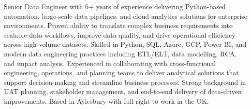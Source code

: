 
\begin{cvparagraph}

Senior Data Engineer with 6+ years of experience delivering Python-based automation, large-scale data pipelines, and cloud analytics solutions for enterprise environments. Proven ability to translate complex business requirements into scalable data workflows, improve data quality, and drive operational efficiency across high-volume datasets. Skilled in Python, SQL, Azure, GCP, Power BI, and modern data engineering practices including ETL/ELT, data modelling, RCA, and impact analysis. Experienced in collaborating with cross-functional engineering, operations, and planning teams to deliver analytical solutions that support decision-making and streamline business processes. Strong background in UAT planning, stakeholder management, and end-to-end delivery of data-driven improvements. Based in Aylesbury with full right to work in the UK.

\end{cvparagraph}
